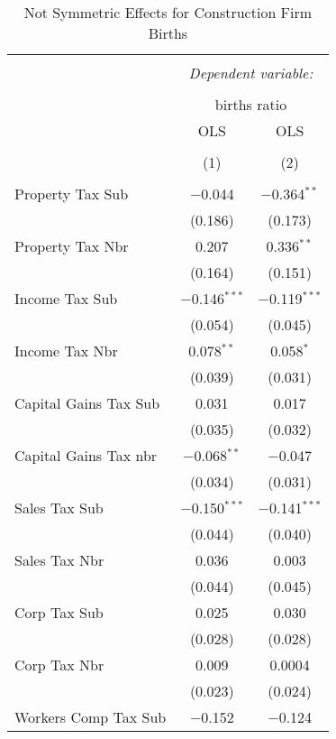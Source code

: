 
\begin{table}[!htbp] \centering 
  \caption{Not Symmetric Effects for  Construction Firm Births} 
  \label{23noequality} 
\footnotesize 
\begin{tabular}{@{\extracolsep{5pt}}lcc} 
\\[-1.8ex]\hline 
\hline \\[-1.8ex] 
 & \multicolumn{2}{c}{\textit{Dependent variable:}} \\ 
\cline{2-3} 
\\[-1.8ex] & \multicolumn{2}{c}{births ratio} \\ 
 & OLS & OLS \\ 
\\[-1.8ex] & (1) & (2)\\ 
\hline \\[-1.8ex] 
 Property Tax Sub & $-$0.044 & $-$0.364$^{**}$ \\ 
  & (0.186) & (0.173) \\ 
  Property Tax Nbr & 0.207 & 0.336$^{**}$ \\ 
  & (0.164) & (0.151) \\ 
  Income Tax Sub & $-$0.146$^{***}$ & $-$0.119$^{***}$ \\ 
  & (0.054) & (0.045) \\ 
  Income Tax Nbr & 0.078$^{**}$ & 0.058$^{*}$ \\ 
  & (0.039) & (0.031) \\ 
  Capital Gains Tax Sub & 0.031 & 0.017 \\ 
  & (0.035) & (0.032) \\ 
  Capital Gains Tax nbr & $-$0.068$^{**}$ & $-$0.047 \\ 
  & (0.034) & (0.031) \\ 
  Sales Tax Sub & $-$0.150$^{***}$ & $-$0.141$^{***}$ \\ 
  & (0.044) & (0.040) \\ 
  Sales Tax Nbr & 0.036 & 0.003 \\ 
  & (0.044) & (0.045) \\ 
  Corp Tax Sub & 0.025 & 0.030 \\ 
  & (0.028) & (0.028) \\ 
  Corp Tax Nbr & 0.009 & 0.0004 \\ 
  & (0.023) & (0.024) \\ 
  Workers Comp Tax Sub & $-$0.152 & $-$0.124 \\ 

\end{tabular}
\end{table}
